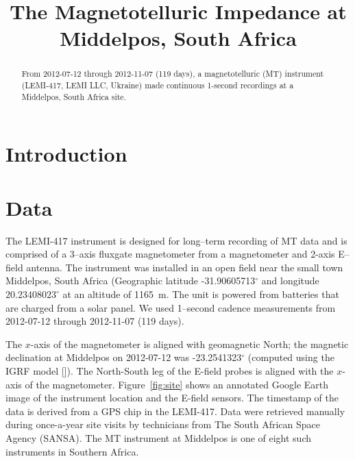 \documentclass[draft,linenumbers]{agujournal2018}
\begin{document}
\title{The Magnetotelluric Impedance at Middelpos, South Africa}





\begin{keypoints}
\item 
\item 
\item 
\end{keypoints}

\begin{abstract}
From 2012-07-12 through 2012-11-07 (119 days), a magnetotelluric (MT) instrument (LEMI-417, LEMI LLC, Ukraine)  made continuous 1-second recordings at a Middelpos, South Africa site.
\end{abstract}

\section{Introduction}

\section{Data}
\label{section:Data}

The LEMI-417 instrument is designed for long--term recording of MT data and is comprised of a 3--axis fluxgate magnetometer from a  magnetometer and 2-axis E--field antenna. The instrument was installed in an open field near the small town Middelpos, South Africa (Geographic latitude -31.90605713$^\circ$ and longitude $20.23408023^\circ$ at an altitude of 1165~m. The unit is powered from batteries that are charged from a solar panel. We used 1--second cadence measurements from 2012-07-12 through 2012-11-07 (119 days).

The $x$-axis of the magnetometer is aligned with geomagnetic North; the magnetic declination at Middelpos on 2012-07-12 was -23.2541323$^\circ$ (computed using the IGRF model [\cite{igrf}]). The North-South leg of the E-field probes is aligned with the $x$-axis of the magnetometer. Figure~\ref{fig:site} shows an annotated Google Earth image of the instrument location and the E-field sensors. The timestamp of the data is derived from a GPS chip in the LEMI-417. Data were retrieved manually during once-a-year site visits by technicians from The South African Space Agency (SANSA). The MT instrument at Middelpos is one of eight such instruments in Southern Africa. 
\end{document}
